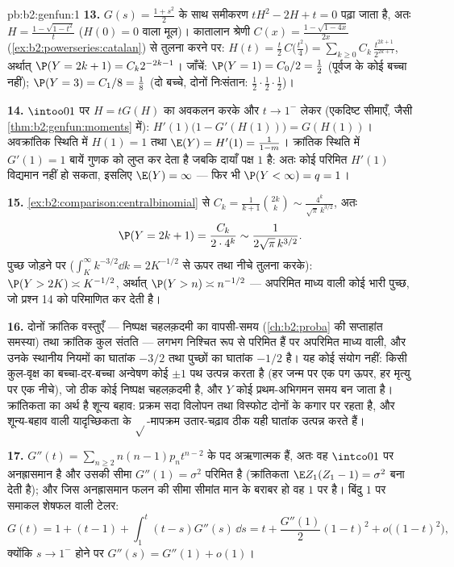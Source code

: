 \begin{solution}{pb:b2:genfun:1}
\textbf{13.} $G(s) = \frac{1 + s^2}2$ के साथ समीकरण $tH^2 - 2H + t = 0$ पढ़ा जाता है, अतः $H = \frac{1 - \sqrt{1 - t^2}}{t}$ ($H(0) = 0$
वाला मूल)। कातालान श्रेणी
$C(x) = \frac{1 - \sqrt{1 - 4x}}{2x}$
(\cref{ex:b2:powerseries:catalan}) से तुलना करने पर: $H(t) = \frac
t2\,C\bigl(\frac{t^2}4\bigr) =
\sum_{k\geq0}C_k\,\frac{t^{2k+1}}{2^{2k+1}}$, अर्थात् $\P(Y =
2k+1) = C_k2^{-2k-1}$। जाँचें: $\P(Y = 1) = C_0/2 = \frac12$ (पूर्वज के
कोई बच्चा नहीं); $\P(Y = 3) = C_1/8 = \frac18$ (दो बच्चे, दोनों निःसंतान: $\frac12\cdot\frac12\cdot
\frac12$)।

\textbf{14.} $\intoo01$ पर $H = tG(H)$ का अवकलन करके और $t \to 1^-$ लेकर (एकदिष्ट सीमाएँ,
जैसी \cref{thm:b2:genfun:moments} में): $H'(1)\bigl(1 - G'(H(1))\bigr)
= G(H(1))$। अवक्रांतिक स्थिति में $H(1) = 1$ तथा $\E(Y) =
H'(1) = \frac1{1 - m}$। क्रांतिक
स्थिति में $G'(1) = 1$ बायें गुणक को लुप्त कर देता है जबकि दायाँ पक्ष $1$
है: अतः कोई परिमित $H'(1)$ विद्यमान नहीं हो सकता, इसलिए $\E(Y) = \infty$ --- फिर
भी $\P(Y <
\infty) = q = 1$।

\textbf{15.} \cref{ex:b2:comparison:centralbinomial} से $C_k = \frac1{k+1}\binom{2k}k \sim
\frac{4^k}{\sqrt\pi\,k^{3/2}}$, अतः
\[
\P(Y = 2k+1) = \frac{C_k}{2\cdot4^{k}} \sim
\frac1{2\sqrt\pi\,k^{3/2}} .
\]
पुच्छ जोड़ने पर ($\int_K^\infty
k^{-3/2}\dd k = 2K^{-1/2}$ से ऊपर तथा नीचे तुलना करके): $\P(Y > 2K)
\asymp K^{-1/2}$, अर्थात्
$\P(Y > n) \asymp n^{-1/2}$ --- अपरिमित माध्य वाली कोई भारी पुच्छ, जो प्रश्न 14 को
परिमाणित कर देती है।

\textbf{16.} दोनों क्रांतिक वस्तुएँ --- निष्पक्ष चहलक़दमी का
वापसी-समय (\cref{ch:b2:proba} की सप्ताहांत समस्या) तथा क्रांतिक कुल संतति ---
लगभग निश्चित रूप से परिमित हैं पर अपरिमित माध्य वाली, और उनके
स्थानीय नियमों का घातांक $-3/2$ तथा पुच्छों का घातांक $-1/2$ है। यह कोई
संयोग नहीं: किसी कुल-वृक्ष का बच्चा-दर-बच्चा अन्वेषण कोई $\pm1$ पथ
उत्पन्न करता है (हर जन्म पर एक पग ऊपर, हर मृत्यु पर एक नीचे), जो
ठीक कोई निष्पक्ष चहलक़दमी है, और $Y$ कोई प्रथम-अभिगमन समय बन जाता
है। क्रांतिकता का अर्थ है शून्य बहाव: प्रक्रम सदा विलोपन तथा
विस्फोट दोनों के कगार पर रहता है, और शून्य-बहाव वाली यादृच्छिकता के
$\sqrt{}$-मापक्रम उतार-चढ़ाव ठीक यही घातांक उत्पन्न करते हैं।

\textbf{17.} $G''(t) = \sum_{n\geq2}n(n-1)p_nt^{n-2}$ के पद अऋणात्मक हैं, अतः वह $\intco01$ पर अनह्रासमान है
और उसकी सीमा $G''(1) = \sigma^2$ परिमित है (क्रांतिकता $\E Z_1(Z_1 - 1) = \sigma^2$ बना देती है); और जिस
अनह्रासमान फलन की सीमा सीमांत मान के बराबर हो वह $1$ पर  है।
बिंदु $1$ पर समाकल शेषफल वाली टेलर:
\[
G(t) = 1 + (t - 1) + \int_1^t(t - s)G''(s)\,\dd s
= t + \frac{G''(1)}2(1-t)^2 + o\bigl((1-t)^2\bigr),
\]
क्योंकि $s \to 1^-$ होने पर $G''(s) = G''(1) + o(1)$।


\end{solution}
